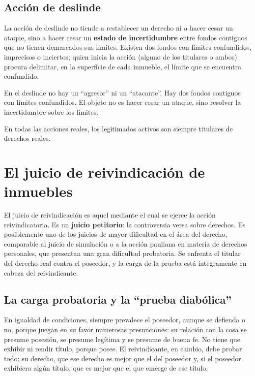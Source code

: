 \documentclass[12pt,oneside]{book}
\begin{document}
\subsection{Acción de deslinde}

La acción de deslinde no tiende a restablecer un derecho ni a hacer cesar un ataque, sino a hacer cesar un \textbf{estado de incertidumbre} entre fondos contiguos que no tienen demarcados sus límites. Existen dos fondos con límites confundidos, imprecisos o inciertos; quien inicia la acción (alguno de los titulares o ambos) procura delimitar, en la superficie de cada inmueble, el límite que se encuentra confundido.

\begin{important}
En el deslinde no hay un ``agresor'' ni un ``atacante''. Hay dos fondos contiguos con límites confundidos. El objeto no es hacer cesar un ataque, sino resolver la incertidumbre sobre los límites.
\end{important}

En todas las acciones reales, los legitimados activos son siempre titulares de derechos reales.

\section{El juicio de reivindicación de inmuebles}

El juicio de reivindicación es aquel mediante el cual se ejerce la acción reivindicatoria. Es un \textbf{juicio petitorio}: la controversia versa sobre derechos. Es posiblemente uno de los juicios de mayor dificultad en el área del derecho, comparable al juicio de simulación o a la acción pauliana en materia de derechos personales, que presentan una gran dificultad probatoria. Se enfrenta el titular del derecho real contra el poseedor, y la carga de la prueba está íntegramente en cabeza del reivindicante.

\subsection{La carga probatoria y la ``prueba diabólica''}

En igualdad de condiciones, siempre prevalece el poseedor, aunque se defienda o no, porque juegan en su favor numerosas presunciones: su relación con la cosa se presume posesión, se presume legítima y se presume de buena fe. No tiene que exhibir ni rendir título, porque posee. El reivindicante, en cambio, debe probar todo: su derecho, que ese derecho es mejor que el del poseedor y, si el poseedor exhibiera algún título, que es mejor que el que emerge de ese título.
\end{document}
